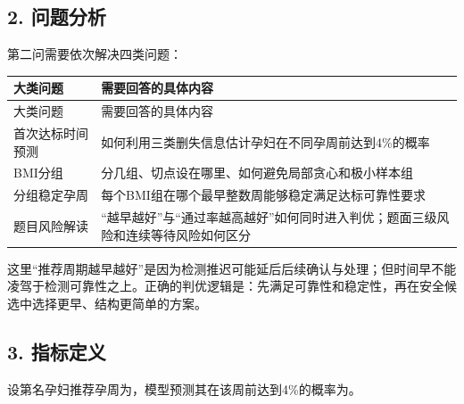 \documentclass[UTF8,12pt,a4paper]{ctexart}
\begin{document}
\subsection{2. 问题分析}
第二问需要依次解决四类问题：

\begingroup
\footnotesize
\setlength{\tabcolsep}{1.5pt}
\begin{longtable}{|>{\raggedright\arraybackslash}p{}|>{\raggedright\arraybackslash}p{}|}
\hline
大类问题 & 需要回答的具体内容 \\ \hline
\endfirsthead
\hline
大类问题 & 需要回答的具体内容 \\ \hline
\endhead
首次达标时间预测 & 如何利用三类删失信息估计孕妇在不同孕周前达到4\%的概率 \\ \hline
BMI分组 & 分几组、切点设在哪里、如何避免局部贪心和极小样本组 \\ \hline
分组稳定孕周 & 每个BMI组在哪个最早整数周能够稳定满足达标可靠性要求 \\ \hline
题目风险解读 & “越早越好”与“通过率越高越好”如何同时进入判优；题面三级风险和连续等待风险如何区分 \\ \hline
\end{longtable}
\endgroup

这里“推荐周期越早越好”是因为检测推迟可能延后后续确认与处理；但时间早不能凌驾于检测可靠性之上。正确的判优逻辑是：先满足可靠性和稳定性，再在安全候选中选择更早、结构更简单的方案。

\subsection{3. 指标定义}
设第\textsf{}名孕妇推荐孕周为\textsf{}，模型预测其在该周前达到4\%的概率为\textsf{}。
\end{document}
